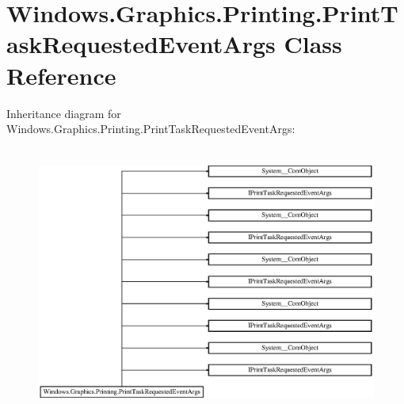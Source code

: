 \hypertarget{class_windows_1_1_graphics_1_1_printing_1_1_print_task_requested_event_args}{}\section{Windows.\+Graphics.\+Printing.\+Print\+Task\+Requested\+Event\+Args Class Reference}
\label{class_windows_1_1_graphics_1_1_printing_1_1_print_task_requested_event_args}
Inheritance diagram for Windows.\+Graphics.\+Printing.\+Print\+Task\+Requested\+Event\+Args\+:\begin{figure}[H]
\begin{center}
\leavevmode
\includegraphics[height=8.927536cm]{class_windows_1_1_graphics_1_1_printing_1_1_print_task_requested_event_args}
\end{center}
\end{figure}
